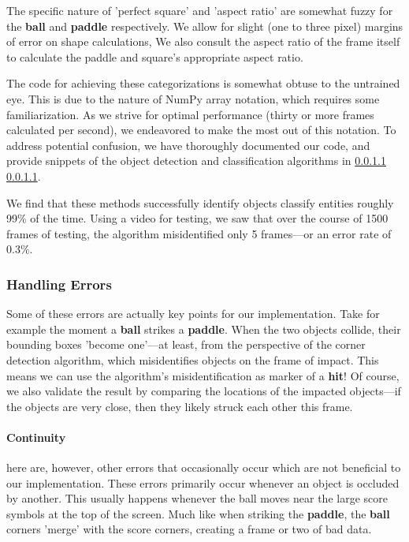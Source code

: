 \documentclass{report}
\newcommand{\state}[1]{\textbf{#1}}
\newcommand{\pad}{\textbf{paddle}\xspace}
\newcommand{\ball}{\textbf{ball}\xspace}
\begin{document}
The specific nature of 'perfect square' and 'aspect ratio' are somewhat fuzzy for the \ball and \pad respectively. We allow for slight (one to three pixel) margins of error on shape calculations, We also consult the aspect ratio of the frame itself to calculate the paddle and square's appropriate aspect ratio. 


The code for achieving these categorizations is somewhat obtuse to the untrained eye. This is due to the nature of NumPy array notation, which requires some familiarization. As we strive for optimal performance (thirty or more frames calculated per second), we endeavored to make the most out of this notation. To address potential confusion, we have thoroughly documented our code, and provide snippets of the object detection and classification algorithms in \ref{} \ref{}.

We find that these methods successfully identify objects classify entities roughly 99\% of the time. Using a video for testing, we saw that over the course of 1500 frames of testing, the algorithm misidentified only 5 frames---or an error rate of $0.3\%$. 

\subsubsection{Handling Errors}

Some of these errors are actually key points for our implementation. Take for example the moment a \ball strikes a \pad. When the two objects collide, their bounding boxes 'become one'---at least, from the perspective of the corner detection algorithm, which misidentifies objects on the frame of impact. This means we can use the algorithm's misidentification as marker of a \state{hit}! Of course, we also validate the result by comparing the locations of the impacted objects---if the objects are very close, then they likely struck each other this frame.

\paragraph{Continuity}

here are, however, other errors that occasionally occur which are not beneficial to our implementation. These errors primarily occur whenever an object is occluded by another. This usually happens whenever the ball moves near the large score symbols at the top of the screen. Much like when striking the \pad, the \ball corners 'merge' with the score corners, creating a frame or two of bad data. 
\end{document}
